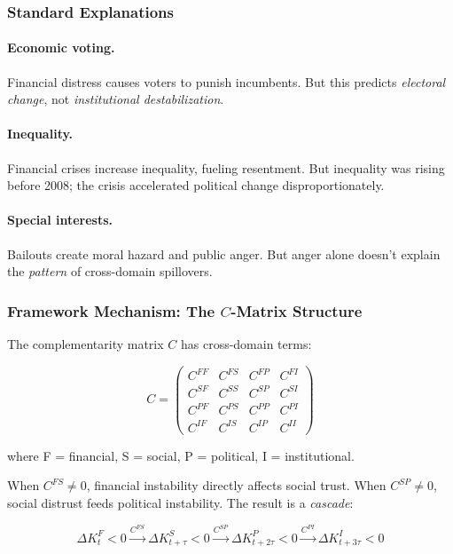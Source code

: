\subsubsection{Standard Explanations}

\paragraph{Economic voting.} Financial distress causes voters to punish incumbents. 
But this predicts \emph{electoral change}, not \emph{institutional destabilization}.

\paragraph{Inequality.} Financial crises increase inequality, fueling resentment.
But inequality was rising before 2008; the crisis accelerated political change disproportionately.

\paragraph{Special interests.} Bailouts create moral hazard and public anger.
But anger alone doesn't explain the \emph{pattern} of cross-domain spillovers.

\subsubsection{Framework Mechanism: The $C$-Matrix Structure}

The complementarity matrix $C$ has cross-domain terms:

\begin{equation}
C = \begin{pmatrix}
C^{FF} & C^{FS} & C^{FP} & C^{FI} \\
C^{SF} & C^{SS} & C^{SP} & C^{SI} \\
C^{PF} & C^{PS} & C^{PP} & C^{PI} \\
C^{IF} & C^{IS} & C^{IP} & C^{II}
\end{pmatrix}
\end{equation}

where F = financial, S = social, P = political, I = institutional.

When $C^{FS} \neq 0$, financial instability directly affects social trust.
When $C^{SP} \neq 0$, social distrust feeds political instability.
The result is a \emph{cascade}:

\begin{equation}
\Delta K^F_t < 0 \xrightarrow{C^{FS}} \Delta K^S_{t+\tau} < 0 \xrightarrow{C^{SP}} \Delta K^P_{t+2\tau} < 0 \xrightarrow{C^{PI}} \Delta K^I_{t+3\tau} < 0
\end{equation}

